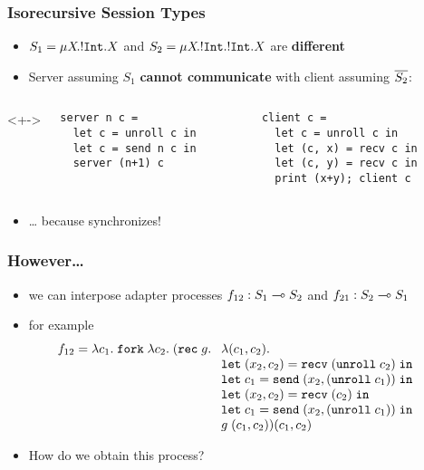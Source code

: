 \documentclass[aspectratio=169]{beamer}
\begin{document}
\begin{frame}[fragile]
  \frametitle{Isorecursive Session Types}
  \begin{itemize}
  \item<+->  $S_1 = \mu X\!.{{}!\mathtt{Int}.X}$ and $S_2 = \mu X\!.{{}!\mathtt{Int}.{}!\mathtt{Int}.X}$ are \textbf{different}
  \item<+-> Server assuming $S_1$ \textbf{cannot communicate} with
    client assuming $\overline{S_2}$:
  \end{itemize}
  \begin{columns}<+->
    \begin{column}{0.48\linewidth}
\begin{verbatim}
server n c =
  let c = unroll c in
  let c = send n c in
  server (n+1) c

\end{verbatim}
    \end{column}
    \begin{column}{0.48\linewidth}
\begin{verbatim}
client c =
  let c = unroll c in
  let (c, x) = recv c in
  let (c, y) = recv c in
  print (x+y); client c
\end{verbatim}
    \end{column}
  \end{columns}
  \begin{itemize}
  \item<+-> \dots{} because \EkwUnroll{} synchronizes!
  \end{itemize}
\end{frame}
\begin{frame}
  \frametitle{However\dots}
  \begin{itemize}
  \item<+-> we can interpose adapter processes $f_{12} : S_1 \multimap S_2$ and $f_{21} : S_2 \multimap S_1$
  \item<+-> for example
    \begin{align*}
  f_{12} &=       \ELam {c_1} \EFork{ \ELam {c_2} (\ERec g %
      \begin{array}[t]{l}
      \ELam{(c_1, c_2)} \\
      \ELet{(x_2,c_2)}{\ERecv{(\EUnroll{c_2})}} \\
      \ELet{c_1}{\ESend{x_2}{(\EUnroll{c_1})}} \\
      \ELet{(x_2,c_2)}{\ERecv{({c_2})}} \\
      \ELet{c_1}{\ESend{x_2}{(\EUnroll{c_1})}} \\
        g \; ({c_1}, {c_2})) (c_1, c_2) %
      \end{array}}
\end{align*}
\item<+-> How do we obtain this process?
  \end{itemize}
\end{frame}
\end{document}

